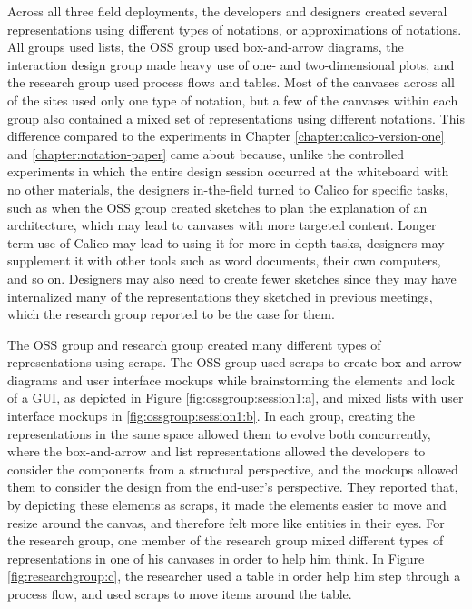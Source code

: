 Across all three field deployments, the developers and designers created several representations using different types of notations, or approximations of notations. All groups used lists, the OSS group used box-and-arrow diagrams, the interaction design group made heavy use of one- and two-dimensional plots, and the research group used process flows and tables. Most of the canvases across all of the sites used only one type of notation, but a few of the canvases within each group also contained a mixed set of representations using different notations. This difference compared to the experiments in Chapter \ref{chapter:calico-version-one} and \ref{chapter:notation-paper} came about because, unlike the controlled experiments in which the entire design session occurred at the whiteboard with no other materials, the designers in-the-field turned to Calico for specific tasks, such as when the OSS group created sketches to plan the explanation of an architecture, which may lead to canvases with more targeted content. Longer term use of Calico may lead to using it for more in-depth tasks, designers may supplement it with other tools such as word documents, their own computers, and so on. Designers may also need to create fewer sketches since they may have internalized many of the representations they sketched in previous meetings, which the research group reported to be the case for them.

The OSS group and research group created many different types of representations using scraps. The OSS group used scraps to create box-and-arrow diagrams and user interface mockups while brainstorming the elements and look of a GUI, as depicted in Figure \ref{fig:ossgroup:session1:a}, and mixed lists with user interface mockups in \ref{fig:ossgroup:session1:b}. In each group, creating the representations in the same space allowed them to evolve both concurrently, where the box-and-arrow and list representations allowed the developers to consider the components from a structural perspective, and the mockups allowed them to consider the design from the end-user's perspective. They reported that, by depicting these elements as scraps, it made the elements easier to move and resize around the canvas, and therefore felt more like entities in their eyes. For the research group, one member of the research group mixed different types of representations in one of his canvases in order to help him think. In Figure \ref{fig:researchgroup:c}, the researcher used a table in order help him step through a process flow, and used scraps to move items around the table.

